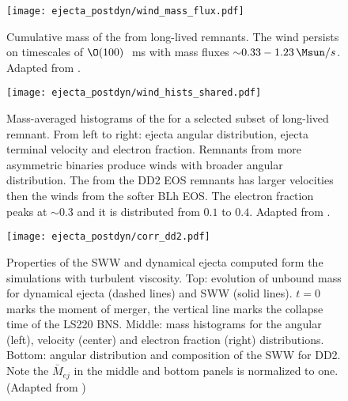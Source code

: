 \begin{figure}[t]
    \centering 
    \texttt{[image: ejecta\_postdyn/wind\_mass\_flux.pdf]}
    \caption{Cumulative mass of the \swind{} from long-lived
        remnants. The wind persists on timescales of $\O(100)\,$~ms with
        mass fluxes ${\sim}0.33-1.23\,\Msun/s$.
        Adapted from \citet{Nedora:2020pak}.
    }
    \label{fig:mej:bern}
\end{figure}

\begin{figure*}[t]
    \centering 
    \texttt{[image: ejecta\_postdyn/wind\_hists\_shared.pdf]}
    \caption{Mass-averaged histograms of the \swind{} for a selected
        subset of long-lived remnant. From left to right: ejecta angular
        distribution, ejecta terminal velocity and electron
        fraction. Remnants from more asymmetric binaries produce winds
        with broader angular distribution.
        The \swind{} from the DD2 EOS remnants has larger velocities
        then the winds from the softer BLh EOS. The electron fraction
        peaks at ${\sim}0.3$ and it is distributed from $0.1$ to $0.4$.
        Adapted from \citet{Nedora:2020pak}.
    }
    \label{fig:ejecta:bern:hist}
\end{figure*}

\begin{figure}[t]
    \centering
    \texttt{[image: ejecta\_postdyn/corr\_dd2.pdf]}
    \caption{Properties of the \ac{SWW} and dynamical ejecta
        computed form the simulations with turbulent viscosity.
        Top: evolution of unbound mass for dynamical ejecta
        (dashed lines)
        and \ac{SWW}
        (solid lines). $t=0$ marks the moment of merger, the vertical
        line marks the collapse time of the LS220 BNS.
        Middle: mass histograms for the angular (left), velocity (center) and electron
        fraction (right) distributions.
        Bottom: angular distribution and composition of the \ac{SWW}
        for DD2.
        Note the $\bar{M}_{ej}$ in the middle and bottom panels is normalized to one.
        (Adapted from \citet{Nedora:2019jhl})
    }
    \label{fig:ej_properties}
    
\end{figure}

